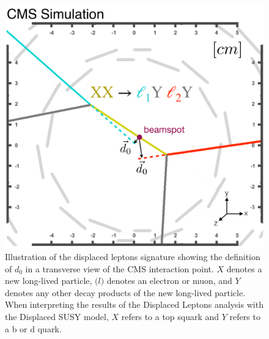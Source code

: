 \begin{figure}[hbtp]
\centering
\includegraphics[scale=0.4]{figures/overview/signalEventDisplay.pdf}
\caption{Illustration of the displaced leptons signature showing the definition of $d_0$ in a transverse view of the CMS interaction point. $X$ denotes a new long-lived particle, $\mathcal(l)$ denotes an electron or muon, and $Y$ denotes any other decay products of the new long-lived particle. When interpreting the results of the Displaced Leptons analysis with the Displaced SUSY model, $X$ refers to a top squark and $Y$ refers to a b or d quark.} 
\label{displaced_leptons_cartoon}
\end{figure}